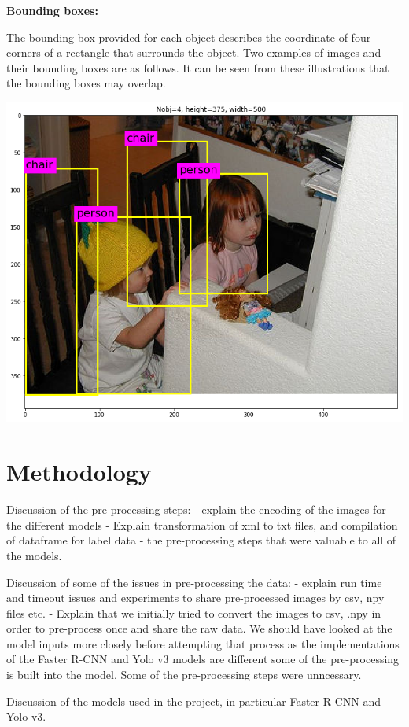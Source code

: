 \documentclass{article}
\begin{document}
\textbf{Bounding boxes:}

The bounding box provided for each object describes the coordinate of four corners of a rectangle that surrounds the object. Two examples of images and their bounding boxes are as follows. It can be seen from these illustrations that the bounding boxes may overlap.

\includegraphics[scale = 0.3]{bbox_example.png}

\section{Methodology}

Discussion of the pre-processing steps:
- explain the encoding of the images for the different models
- Explain transformation of xml to txt files, and compilation of dataframe for label data - the pre-processing steps that were valuable to all of the models.

Discussion of some of the issues in pre-processing the data:
- explain run time and timeout issues and experiments to share pre-processed images by csv, npy files etc.
- Explain that we initially tried to convert the images to csv, .npy in order to pre-process once and share the raw data. We should have looked at the model inputs more closely before attempting that process as the implementations of the Faster R-CNN and Yolo v3 models are different some of the pre-processing is built into the model. Some of the pre-processing steps were unncessary.

Discussion of the models used in the project, in particular Faster R-CNN and Yolo v3.
\end{document}
